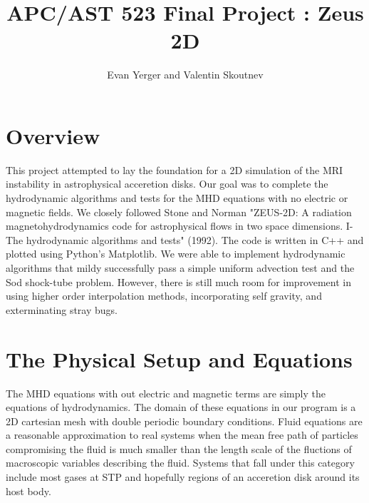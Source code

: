 \documentclass[11pt]{article}
\title{APC/AST 523 Final Project : Zeus 2D}
\author{Evan Yerger and Valentin Skoutnev}
\begin{document}
\pagestyle{empty}

\maketitle

\def\normalbaselines{\baselineskip20pt \lineskip3pt \lineskiplimit3pt}

\def\mapright{\smash{\mathop{\longrightarrow}}}
\def\mapincl{\smash{\mathop{\hookrightarrow}}}
\def\mapup{\Big\uparrow}
\def\mapdown{\Big\downarrow}
\def\mapdowneq{\Big\parallel}

\def\Mapright#1{\smash{\mathop{\longrightarrow}\limits^{#1}}}
\def\Mapincl#1{\smash{\mathop{\hookrightarrow}\limits^{#1}}}
\def\Mapup#1{\Big\uparrow\rlap{$\vcenter{\hbox{$\scriptstyle#1$}}$}}
\def\Mapdown#1{\Big\downarrow\rlap{$\vcenter{\hbox{$\scriptstyle#1$}}$}}
\def\Mapdowneq#1{\Big\parallel\rlap{$\vcenter{\hbox{$\scriptstyle#1$}}$}}

\section{Overview}
This project attempted to lay the foundation for a 2D simulation of the MRI instability in astrophysical acceretion disks. Our goal was to complete the hydrodynamic algorithms and tests for the MHD equations with no electric or magnetic fields. We closely followed Stone and Norman "ZEUS-2D: A radiation magnetohydrodynamics code for astrophysical flows in two space dimensions. I-The hydrodynamic algorithms and tests" (1992). The code is written in C++ and plotted using Python's Matplotlib. We were able to implement hydrodynamic algorithms that mildy successfully pass a simple uniform advection test and the Sod shock-tube problem. However, there is still much room for improvement in using higher order interpolation methods, incorporating self gravity, and exterminating stray bugs.

\section{The Physical Setup and Equations}
The MHD equations with out electric and magnetic terms are simply the equations of hydrodynamics. The domain of these equations in our program is a 2D cartesian mesh with double periodic boundary conditions. Fluid equations are a reasonable approximation to real systems when the mean free path of particles compromising the fluid is much smaller than the length scale of the fluctions of macroscopic variables describing the fluid. Systems that fall under this category include most gases at STP and hopefully regions of an  acceretion disk around its host body.
    
\end{document}
